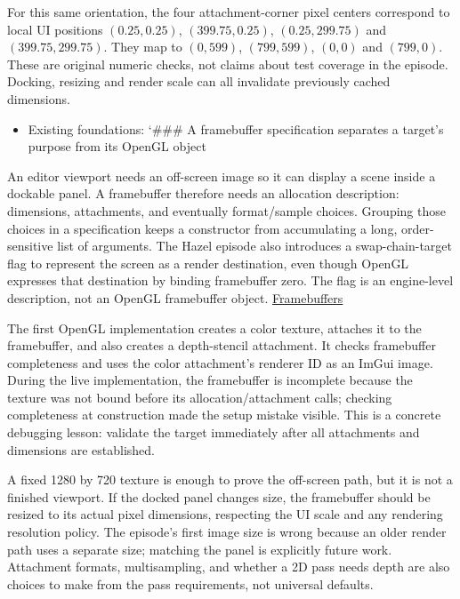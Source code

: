 For this same orientation, the four attachment-corner pixel centers correspond to local UI positions \((0.25,0.25)\), \((399.75,0.25)\), \((0.25,299.75)\) and \((399.75,299.75)\). They map to \((0,599)\), \((799,599)\), \((0,0)\) and \((799,0)\). These are original numeric checks, not claims about test coverage in the episode. Docking, resizing and render scale can all invalidate previously cached dimensions.

\begin{itemize}
\tightlist
\item
  Existing foundations: `\#\#\# A framebuffer specification separates a target's purpose from its OpenGL object
\end{itemize}

An editor viewport needs an off-screen image so it can display a scene inside a dockable panel. A framebuffer therefore needs an allocation description: dimensions, attachments, and eventually format/sample choices. Grouping those choices in a specification keeps a constructor from accumulating a long, order-sensitive list of arguments. The Hazel episode also introduces a swap-chain-target flag to represent the screen as a render destination, even though OpenGL expresses that destination by binding framebuffer zero. The flag is an engine-level description, not an OpenGL framebuffer object. \href{https://www.youtube.com/watch?v=93bavRgVcwA}{Framebuffers}

The first OpenGL implementation creates a color texture, attaches it to the framebuffer, and also creates a depth-stencil attachment. It checks framebuffer completeness and uses the color attachment's renderer ID as an ImGui image. During the live implementation, the framebuffer is incomplete because the texture was not bound before its allocation/attachment calls; checking completeness at construction made the setup mistake visible. This is a concrete debugging lesson: validate the target immediately after all attachments and dimensions are established.

A fixed 1280 by 720 texture is enough to prove the off-screen path, but it is not a finished viewport. If the docked panel changes size, the framebuffer should be resized to its actual pixel dimensions, respecting the UI scale and any rendering resolution policy. The episode's first image size is wrong because an older render path uses a separate size; matching the panel is explicitly future work. Attachment formats, multisampling, and whether a 2D pass needs depth are also choices to make from the pass requirements, not universal defaults.

